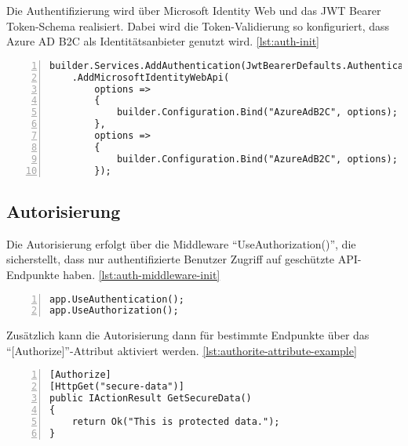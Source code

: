 Die Authentifizierung wird über Microsoft Identity Web und das JWT Bearer Token-Schema realisiert. 
Dabei wird die Token-Validierung so konfiguriert, dass Azure AD B2C als Identitätsanbieter 
genutzt wird. \ref{lst:auth-init}

\begin{lstlisting}[numbers=left,caption={Authentifizierung-Initialisierung},label={lst:auth-init}]
builder.Services.AddAuthentication(JwtBearerDefaults.AuthenticationScheme)
    .AddMicrosoftIdentityWebApi(
        options => 
        {
            builder.Configuration.Bind("AzureAdB2C", options);
        },
        options =>
        {
            builder.Configuration.Bind("AzureAdB2C", options);
        });

\end{lstlisting}

\subsection{Autorisierung}

Die Autorisierung erfolgt über die Middleware ``UseAuthorization()'', die sicherstellt, 
dass nur authentifizierte Benutzer Zugriff auf geschützte API-Endpunkte haben. \ref{lst:auth-middleware-init}

\begin{lstlisting}[numbers=left,caption={Autorisierungs Middleware Initialisierung},label={lst:auth-middleware-init}]
app.UseAuthentication();
app.UseAuthorization();    
\end{lstlisting}

Zusätzlich kann die Autorisierung dann für bestimmte Endpunkte über 
das ``[Authorize]''-Attribut aktiviert werden. \ref{lst:authorite-attribute-example}

\begin{lstlisting}[numbers=left,caption={Authorize-Attribut Beispiel},label={lst:authorite-attribute-example}]
[Authorize]
[HttpGet("secure-data")]
public IActionResult GetSecureData()
{
    return Ok("This is protected data.");
}    
\end{lstlisting}

